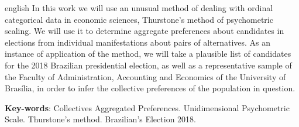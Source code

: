 \documentclass[
	article,			%
	12pt,				%
	oneside,			%
	a4paper,			%
	english,			%
	brazil,				%
	]{abntex2}
\begin{document}
\renewcommand{\resumoname}{Abstract}
\begin{resumoumacoluna}
 \begin{otherlanguage*}{english}
In this work we will use an unusual method of dealing with ordinal categorical data in economic sciences, Thurstone's method of psychometric scaling. We will use it to determine aggregate preferences about candidates in elections from individual manifestations about pairs of alternatives. As an instance of application of the method, we will take a plausible list of candidates for the 2018 Brazilian presidential election, as well as a representative sample of the Faculty of Administration, Accounting and Economics of the University of Brasília, in order to infer the collective preferences of the population in question.

   \vspace{\onelineskip}
 
   \noindent
   \textbf{Key-words}: Collectives Aggregated Preferences. Unidimensional Psychometric Scale. Thurstone's method. Brazilian's Election 2018.
 \end{otherlanguage*}  
\end{resumoumacoluna}

\end{document}

